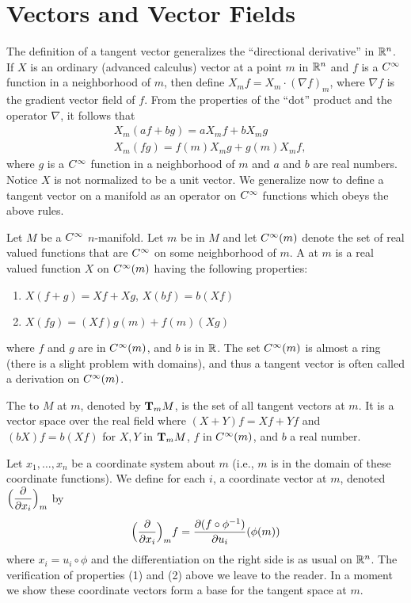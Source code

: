 \documentclass[../main]{subfiles}
\begin{document}
\section{Vectors and Vector Fields}\label{ch01:s3}

The definition of a tangent vector generalizes the ``directional derivative'' in $\bR^n$. If $X$ is an ordinary (advanced calculus) vector at a point $m$ in $\bR^n$ and $f$ is a $\CInfty$ function in a neighborhood of $m$, then define $X_mf=X_m\cdot(\nabla f)_m$, where $\nabla f$ is the gradient vector field of $f$. From the properties of the ``dot'' product and the operator $\nabla$, it follows that
\begin{align*}
&X_m(af+bg)=aX_mf+bX_mg\\
&X_m(fg)=f(m)X_mg+g(m)X_mf,
\end{align*}
where $g$ is a $\CInfty$ function in a neighborhood of $m$ and $a$ and $b$ are real numbers. Notice $X$ is not normalized to be a unit vector. We generalize now to define a tangent vector on a manifold as an operator on $\CInfty$ functions which obeys the above rules.

Let $M$ be a $\CInfty$ $n$-manifold. Let $m$ be in $M$ and let $\CInfty(m)$ denote the set of real valued functions that are $\CInfty$ on some neighborhood of $m$. A  at $m$ is a real valued function $X$ on $\CInfty(m)$ having the following properties:
\begin{enumerate}[label=(\arabic*)]
    \item $X(f+g)=Xf+Xg$, $X(bf)=b(Xf)$
    \item $X(fg)=(Xf)g(m)+f(m)(Xg)$
\end{enumerate}
where $f$ and $g$ are in $\CInfty(m)$, and $b$ is in $\bR$. The set $\CInfty(m)$ is almost a ring (there is a slight problem with domains), and thus a tangent vector is often called a derivation on $\CInfty(m)$.

The  to $M$ at $m$, denoted by $\tangentspace{M}{m}$, is the set of all tangent vectors at $m$. It is a vector space over the real field where $(X+Y)f=Xf+Yf$ and $(bX)f=b(Xf)$ for $X,Y$ in $\tangentspace{M}{m}$, $f$ in $\CInfty(m)$, and $b$ a real number.

Let $x_1,\dots,x_n$ be a coordinate system about $m$ (i.e., $m$ is in the domain of these coordinate functions). We define for each $i$, a coordinate vector at $m$, denoted $\Bigr(\pdv{}{x_i}\Bigl)_m$ by \[\Bigr(\pdv{}{x_i}\Bigl)_m f=\pdv{(f\circ\phi^{-1})}{u_i}(\phi(m))\] where $x_i=u_i \circ \phi$ and the differentiation on the right side is as usual on $\bR^n$. The verification of properties (1) and (2) above we leave to the reader. In a moment we show these coordinate vectors form a base for the tangent space at $m$.
\end{document}
